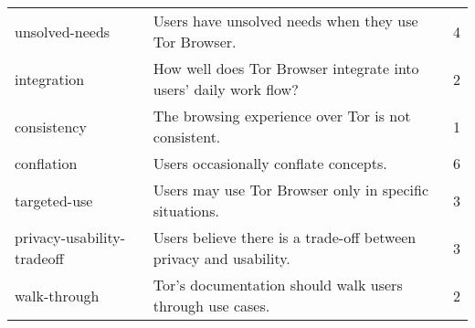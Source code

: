 \begin{table*}[ht]
\begin{tabular}{l l r}
	unsolved-needs & Users have unsolved needs when they use Tor Browser. & 4 \\
	integration & How well does Tor Browser integrate into users' daily work flow? & 2 \\
	consistency & The browsing experience over Tor is not consistent. & 1 \\
	conflation & Users occasionally conflate concepts. & 6 \\
	targeted-use & Users may use Tor Browser only in specific situations. & 3 \\
	privacy-usability-tradeoff & Users believe there is a trade-off between privacy and usability. & 3 \\
	walk-through & Tor's documentation should walk users through use cases. & 2 \\

	\bottomrule
	\end{tabular}
\end{table*}

